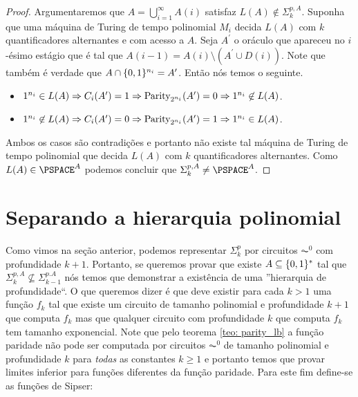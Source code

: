 \begin{proof}
Argumentaremos que $A = \bigcup_{i = 1}^{\infty}A(i)$ satisfaz $L(A) \not\in \Sigma_{k}^{p, A}$. Suponha que uma máquina de Turing de tempo polinomial $M_{i}$ decida $L(A)$ com $k$ quantificadores alternantes e com acesso a $A$. Seja $A^{\prime}$ o oráculo que apareceu no $i$-ésimo estágio que é tal que $A(i - 1) = A(i) \setminus (A^{\prime} \cup D(i))$. Note que também é verdade que $A \cap \{0, 1\}^{n_{i}} = A^{\prime}$. Então nós temos o seguinte.

\begin{itemize}

    \item $1^{n_{i}} \in L(A) \Rightarrow C_{i}(A^{\prime}) = 1 \Rightarrow \text{Parity}_{2^{n_{i}}}(A^{\prime}) = 0 \Rightarrow 1^{n_{i}} \not\in L(A)$.

    \item $1^{n_{i}} \not\in L(A) \Rightarrow C_{i}(A^{\prime}) = 0 \Rightarrow \text{Parity}_{2^{n_{i}}}(A^{\prime}) = 1 \Rightarrow 1^{n_{i}} \in L(A)$.

\end{itemize}

Ambos os casos são contradições e portanto não existe tal máquina de Turing de tempo polinomial que decida $L(A)$ com $k$ quantificadores alternantes. Como $L(A) \in \PSPACE^{A}$ podemos concluir que $\Sigma_{k}^{p, A} \neq \PSPACE^{A}$.

\end{proof}



\section{Separando a hierarquia polinomial} \label{section_separating_PH}

Como vimos na seção anterior, podemos representar $\Sigma_{k}^{p}$ por circuitos $\AC^{0}$ com profundidade $k + 1$. Portanto, se queremos provar que existe $A \subseteq \{0, 1\}^{*}$ tal que $\Sigma_{k}^{p, A} \not\subseteq \Sigma_{k - 1}^{p. A}$ nós temos que demonstrar a existência de uma ''hierarquia de profundidade``. O que queremos dizer é que deve existir para cada $k > 1$ uma função $f_{k}$ tal que existe um circuito de tamanho polinomial e profundidade $k + 1$ que computa $f_{k}$ mas que qualquer circuito com profundidade $k$ que computa $f_{k}$ tem tamanho exponencial. Note que pelo teorema \ref{teo: parity_lb} a função paridade não pode ser computada por circuitos $\AC^{0}$ de tamanho polinomial e profundidade $k$ para \emph{todas} as constantes $k \geq 1$ e portanto temos que provar limites inferior para funções diferentes da função paridade. Para este fim define-se as funções de Sipser:

